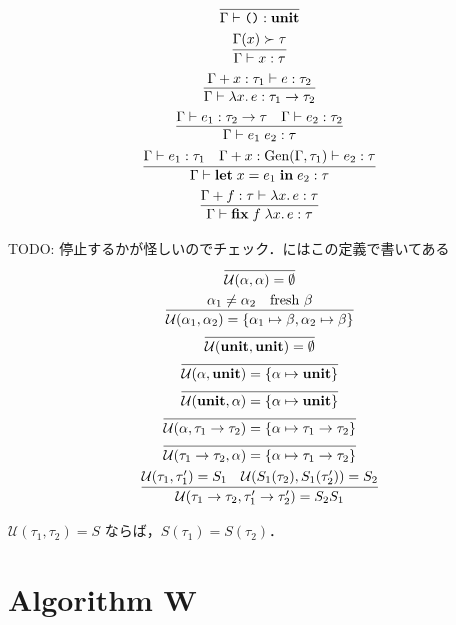 \begin{gather*}
  \infer{\Gamma \vdash \text{\texttt{()}}: \mathbf{unit}}{}
  \\
  \infer{\Gamma \vdash x: \tau}{
    \Gamma(x) \succ \tau
  }
  \\
  \infer{\Gamma \vdash \lambda x\ldotp e: \tau_1 \to \tau_2}{
    \Gamma + x:\tau_1\vdash e: \tau_2
  }
  \\
  \infer{\Gamma \vdash e_1\; e_2: \tau}{
    \Gamma \vdash e_1: \tau_2 \to \tau
    &
    \Gamma \vdash e_2: \tau_2
  }
  \\
  \infer{\Gamma \vdash \mathbf{let}\; x = e_1\; \mathbf{in}\; e_2: \tau}{
    \Gamma \vdash e_1: \tau_1
    &
    \Gamma + x: \mathrm{Gen}(\Gamma, \tau_1) \vdash e_2: \tau
  }
  \\
  \infer{\Gamma \vdash \mathbf{fix}\;f\;\lambda x\ldotp e: \tau}{
    \Gamma + f: \tau \vdash \lambda x\ldotp e: \tau
  }
\end{gather*}

TODO: 停止するかが怪しいのでチェック．\cite{Grabmuller:2006}にはこの定義で書いてある
\begin{gather*}
  \infer{\mathcal{U}(\alpha, \alpha) = \emptyset}{}
  \\
  \infer{\mathcal{U}(\alpha_1, \alpha_2) = \{\alpha_1 \mapsto \beta, \alpha_2 \mapsto \beta\}}{
    \alpha_1 \neq \alpha_2
    &
    \text{fresh $\beta$}
  }
  \\
  \infer{\mathcal{U}(\mathbf{unit}, \mathbf{unit}) = \emptyset}{}
  \\
  \infer{\mathcal{U}(\alpha, \mathbf{unit}) = \{\alpha \mapsto \mathbf{unit}\}}{}
  \\
  \infer{\mathcal{U}(\mathbf{unit}, \alpha) = \{\alpha \mapsto \mathbf{unit}\}}{}
  \\
  \infer{\mathcal{U}(\alpha, \tau_1 \to \tau_2) = \{\alpha \mapsto \tau_1 \to \tau_2\}}{}
  \\
  \infer{\mathcal{U}(\tau_1 \to \tau_2, \alpha) = \{\alpha \mapsto \tau_1 \to \tau_2\}}{}
  \\
  \infer{\mathcal{U}(\tau_1 \to \tau_2, \tau'_1 \to \tau'_2) = S_2S_1}{
    \mathcal{U}(\tau_1, \tau'_1) = S_1
    &
    \mathcal{U}(S_1(\tau_2), S_1(\tau'_2)) = S_2
  }
\end{gather*}

\begin{theorem}
  $\mathcal{U}(\tau_1, \tau_2) = S$ ならば，$S(\tau_1) = S(\tau_2)$．
\end{theorem}

\section{Algorithm W}

